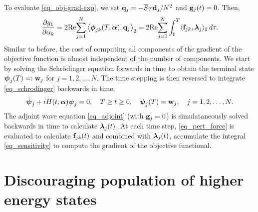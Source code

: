 \documentclass[11pt]{article}
\begin{document}
To evaluate \eqref{eq_obj-grad-exp}, we set ${\mathbf q}_j = -\overline{S}_T {\mathbf d}_j/N^2$ and ${\mathbf g}_j(t)=0$. Then,
\begin{equation}\label{eq_sensitivity}
  \frac{\partial g_1}{\partial \alpha_k} =  2 {\rm Re}\! \sum_{j=1}^N \left\langle \boldsymbol{\phi}_{jk}(T,\boldsymbol{\alpha}),
  {\mathbf q}_j\right\rangle_2 =
  2 {\rm Re}\! \sum_{j=1}^N \int_0^T \langle {\mathbf f}_{jk},\boldsymbol{\lambda}_j \rangle_2\, d\tau.
\end{equation}
Similar to before, the cost of computing all components of the gradient of the objective function is
almost independent of the number of components. We start by solving the Schr\"odinger equation
forwards in time to obtain the terminal state $\boldsymbol{\psi}_j(T)=:{\mathbf w}_j$ for $j=1,2,\ldots,N$. The time
stepping is then reversed to integrate \eqref{eq_schrodinger} backwards in time,
\begin{equation}
\dot{\boldsymbol{\psi}}_j + iH(t,\boldsymbol{\alpha})\boldsymbol{\psi}_j=0,\quad T\geq t\geq 0, \quad \boldsymbol{\psi}_j(T)={\mathbf w}_j,\quad j=1,2,\ldots,N.
\end{equation}
The adjoint wave equation \eqref{eq_adjoint}  (with ${\mathbf g}_j=0$) is simulataneously solved backwards in time to
calculate $\boldsymbol{\lambda}_j(t)$. At each time step, \eqref{eq_pert_force} is evaluated to calculate ${\mathbf f}_{jk}(t)$ and combined with
$\boldsymbol{\lambda}_j(t)$, accumulate the integral \eqref{eq_sensitivity} to compute the gradient of the
objective functional.

\section{Discouraging population of higher energy states}
\end{document}
